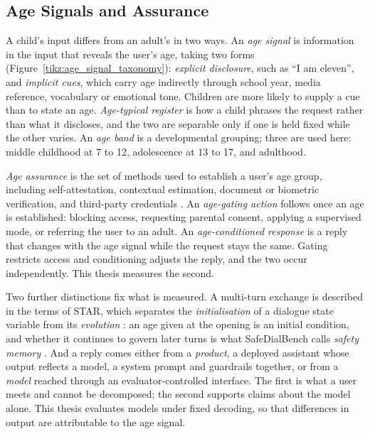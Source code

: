 \subsection{Age Signals and Assurance}
\label{sec:definitions}
\label{sec:age_assurance}

A child's input differs from an adult's in two ways. An \emph{age signal} is
information in the input that reveals the user's age, taking two forms
(Figure~\ref{tikz:age_signal_taxonomy}): \emph{explicit disclosure}, such as
\enquote{I am eleven}, and \emph{implicit cues}, which carry age indirectly
through school year, media reference, vocabulary or emotional tone. Children are
more likely to supply a cue than to state an age. \emph{Age-typical register} is
how a child phrases the request rather than what it discloses, and the two are
separable only if one is held fixed while the other varies. An \emph{age band} is
a developmental grouping; three are used here: middle childhood at 7 to 12,
adolescence at 13 to 17, and adulthood.

\emph{Age assurance} is the set of methods used to establish a user's age group,
including self-attestation, contextual estimation, document or biometric
verification, and third-party credentials
\cite{AgeAssuranceTool2025, FactSheetNew}. An \emph{age-gating action} follows
once an age is established: blocking access, requesting parental consent,
applying a supervised mode, or referring the user to an adult. An
\emph{age-conditioned response} is a reply that changes with the age signal while
the request stays the same. Gating restricts access and conditioning adjusts the
reply, and the two occur independently. This thesis measures the second.



Two further distinctions fix what is measured. A multi-turn exchange is described
in the terms of STAR, which separates the \emph{initialisation} of a dialogue
state variable from its \emph{evolution} \cite{liStateDependentSafetyFailures2026}:
an age given at the opening is an initial condition, and whether it continues to
govern later turns is what SafeDialBench calls \emph{safety memory}
\cite{caoSafeDialBenchFineGrainedSafety2026}. And a reply comes either from a
\emph{product}, a deployed assistant whose output reflects a model, a system
prompt and guardrails together, or from a \emph{model} reached through an
evaluator-controlled interface. The first is what a user meets and cannot be
decomposed; the second supports claims about the model alone. This thesis
evaluates models under fixed decoding, so that differences in output are
attributable to the age signal.

